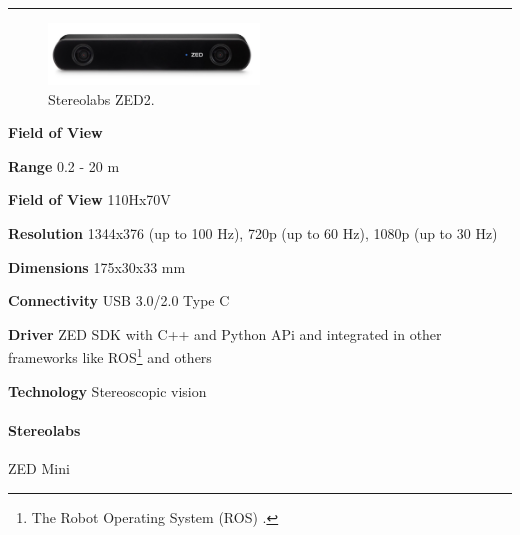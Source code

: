 \documentclass[../main.tex]{subfiles}
\begin{document}
\noindent\rule{8cm}{0.1pt}
\begin{figure}[H]
    \centering
    \includegraphics[width=0.5\textwidth]{images/zed2.png}
    \caption{Stereolabs ZED2.}
    \label{fig:zed2}
\end{figure}
\begin{labeling}{\textbf{Field of View    }}
    \setlength{\itemindent}{2em}
    \item [\textbf{Range}] 0.2 - 20 m
    \item [\textbf{Field of View}] 110Hx70V
    \item [\textbf{Resolution}] 1344x376 (up to 100 Hz), 720p (up to 60 Hz), 1080p (up to 30 Hz)
    \item [\textbf{Dimensions}] 175x30x33 mm
    \item [\textbf{Connectivity}] USB 3.0/2.0 Type C
    \item [\textbf{Driver}] ZED SDK with C++ and Python APi and integrated in other frameworks like ROS\footnote{The Robot Operating System (ROS) \cite{ROS_cite}.} and others
    \item [\textbf{Technology}] Stereoscopic vision
\end{labeling}
\vspace{1em}
\paragraph{\large \textbf{Stereolabs}} {\large ZED Mini}
\end{document}
